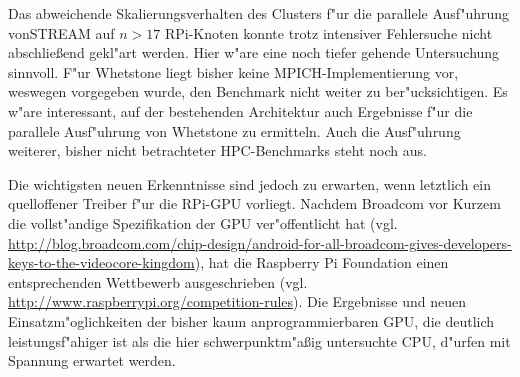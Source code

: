 Das abweichende Skalierungsverhalten des Clusters f"ur die parallele Ausf"uhrung von\newline STREAM auf $n>17$ RPi-Knoten konnte trotz intensiver Fehlersuche nicht abschlie\ss end gekl"art werden. Hier w"are eine noch tiefer gehende Untersuchung sinnvoll. F"ur Whetstone liegt bisher keine MPICH-Implementierung vor, weswegen vorgegeben wurde, den Benchmark nicht weiter zu ber"ucksichtigen. Es w"are interessant, auf der bestehenden Architektur auch Ergebnisse f"ur die parallele Ausf"uhrung von Whetstone zu ermitteln. Auch die Ausf"uhrung weiterer, bisher nicht betrachteter HPC-Benchmarks steht noch aus. 

Die wichtigsten neuen Erkenntnisse sind jedoch zu erwarten, wenn letztlich ein quelloffener Treiber f"ur die RPi-GPU vorliegt. Nachdem Broadcom vor Kurzem die vollst"andige Spezifikation der GPU ver"offentlicht hat (vgl. \url{http://blog.broadcom.com/chip-design/android-for-all-broadcom-gives-developers-keys-to-the-videocore-kingdom}), hat die Raspberry Pi Foundation einen entsprechenden Wettbewerb ausgeschrieben (vgl. \url{http://www.raspberrypi.org/competition-rules}). Die Ergebnisse und neuen Einsatzm"oglichkeiten der bisher kaum anprogrammierbaren GPU, die deutlich leistungsf"ahiger ist als die hier schwerpunktm"a\ss ig untersuchte CPU, d"urfen mit Spannung erwartet werden. 
\endinput
